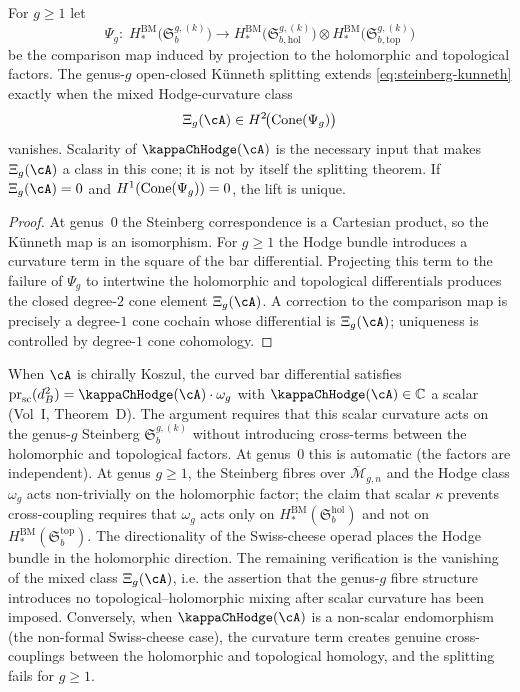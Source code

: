 \begin{proposition}
\label{prop:kunneth-koszul-lift-criterion}
For $g\geq 1$ let
\[
\Psi_g:\;
H_*^{\mathrm{BM}}\!\bigl(\mathfrak{S}_b^{g,(k)}\bigr)
\longrightarrow
H_*^{\mathrm{BM}}\!\bigl(\mathfrak{S}_{b,\mathrm{hol}}^{g,(k)}\bigr)
\otimes
H_*^{\mathrm{BM}}\!\bigl(\mathfrak{S}_{b,\mathrm{top}}^{g,(k)}\bigr)
\]
be the comparison map induced by projection to the holomorphic and topological factors.
The genus-$g$ open-closed K\"unneth splitting extends \eqref{eq:steinberg-kunneth}
exactly when the mixed Hodge-curvature class
\[
\Xi_g(\cA)
\in
H^2\!\bigl(\Cone(\Psi_g)\bigr)
\]
vanishes. Scalarity of $\kappaChHodge(\cA)$ is the necessary input that makes
$\Xi_g(\cA)$ a class in this cone; it is not by itself the splitting theorem.
If $\Xi_g(\cA)=0$ and $H^1(\operatorname{Cone}(\Psi_g))=0$, the lift is unique.
\end{proposition}

\begin{proof}
At genus~$0$ the Steinberg correspondence is a Cartesian product, so the K\"unneth map is an
isomorphism. For $g\geq 1$ the Hodge bundle introduces a curvature term in the square of the
bar differential. Projecting this term to the failure of $\Psi_g$ to intertwine the
holomorphic and topological differentials produces the closed degree-$2$ cone element
$\Xi_g(\cA)$. A correction to the comparison map is precisely a degree-$1$ cone cochain
whose differential is $\Xi_g(\cA)$; uniqueness is controlled by degree-$1$ cone cohomology.
\end{proof}

\begin{remark}
When $\cA$ is chirally Koszul, the curved bar differential satisfies
$\operatorname{pr}_{\mathrm{sc}}(d_B^2) = \kappaChHodge(\cA)\cdot\omega_g$
with $\kappaChHodge(\cA) \in \C$ a scalar (Vol~I, Theorem~D).
The argument requires that this scalar curvature acts on the
genus-$g$ Steinberg $\mathfrak{S}_b^{g,(k)}$ without introducing
cross-terms between the holomorphic and topological factors.
At genus~$0$ this is automatic (the factors are independent).
At genus $g \geq 1$, the Steinberg fibres over
$\overline{\mathcal{M}}_{g,n}$ and the Hodge class $\omega_g$
acts non-trivially on the holomorphic factor; the claim that
scalar $\kappa$ prevents cross-coupling requires that $\omega_g$
acts only on $H_*^{\mathrm{BM}}(\mathfrak{S}_b^{\mathrm{hol}})$
and not on $H_*^{\mathrm{BM}}(\mathfrak{S}_b^{\mathrm{top}})$.
The directionality of the Swiss-cheese operad places the Hodge bundle in the holomorphic
direction. The remaining verification is the vanishing of the mixed class
$\Xi_g(\cA)$, i.e. the assertion that the genus-$g$ fibre structure introduces no
topological--holomorphic mixing after scalar curvature has been imposed.
Conversely, when $\kappaChHodge(\cA)$ is a non-scalar endomorphism
(the non-formal Swiss-cheese case), the curvature term creates genuine
cross-couplings between the holomorphic and topological homology,
and the splitting fails for $g \geq 1$.
\end{remark}

